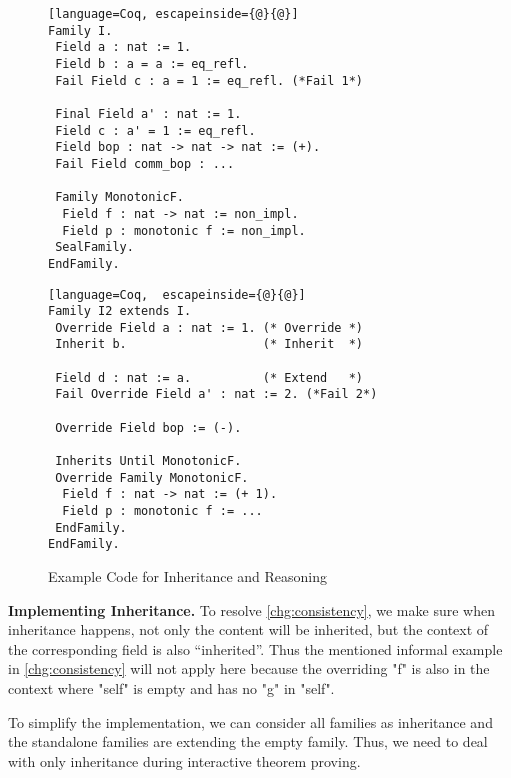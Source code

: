 \begin{figure}[!htb]
  \begin{minipage}[t]{0.45\linewidth}
\begin{lstlisting}[language=Coq, escapeinside={@}{@}]
Family I.
 Field a : nat := 1.
 Field b : a = a := eq_refl.
 Fail Field c : a = 1 := eq_refl. (*Fail 1*)

 Final Field a' : nat := 1.
 Field c : a' = 1 := eq_refl.
 Field bop : nat -> nat -> nat := (+).
 Fail Field comm_bop : ...

 Family MonotonicF.
  Field f : nat -> nat := non_impl.
  Field p : monotonic f := non_impl.
 SealFamily. 
EndFamily.
\end{lstlisting}
  \end{minipage}
\begin{minipage}[t]{0.45\linewidth}
\begin{lstlisting}[language=Coq,  escapeinside={@}{@}]
Family I2 extends I.
 Override Field a : nat := 1. (* Override *)
 Inherit b.                   (* Inherit  *)

 Field d : nat := a.          (* Extend   *)
 Fail Override Field a' : nat := 2. (*Fail 2*)

 Override Field bop := (-).

 Inherits Until MonotonicF.
 Override Family MonotonicF.
  Field f : nat -> nat := (+ 1).
  Field p : monotonic f := ...
 EndFamily. 
EndFamily.
\end{lstlisting}
  \end{minipage}
  \caption{Example Code for Inheritance and Reasoning}\label{fig:plugin-example3}
\end{figure}

\textbf{Implementing Inheritance.}
To resolve \ref{chg:consistency}, we make sure when inheritance happens, not only the content will be inherited, but the context of the corresponding field is also ``inherited''. Thus the mentioned informal example in \ref{chg:consistency} will not apply here because the overriding "f" is also in the context where "self" is empty and has no "g" in "self". 

To simplify the implementation, we can consider all families as
inheritance and the standalone families are extending the empty family.
Thus, we need to deal with only inheritance during interactive theorem proving.


